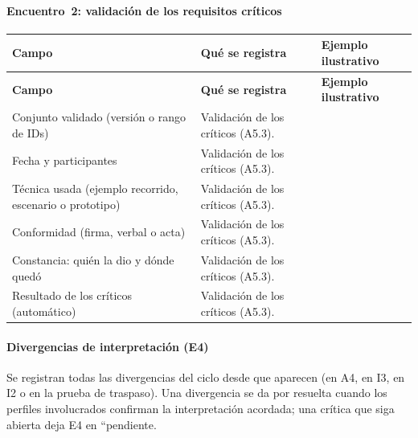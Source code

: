 \documentclass[12pt,letterpaper,oneside]{report}
\begin{document}
\paragraph{Encuentro~2: validación de los requisitos críticos}
{\scriptsize\renewcommand{\arraystretch}{1.25}\setlength{\tabcolsep}{3pt}
\begin{xltabular}{\textwidth}{@{}>{\raggedright\arraybackslash}p{0.25\textwidth}>{\raggedright\arraybackslash}X>{\raggedright\arraybackslash}p{0.30\textwidth}@{}}
\toprule
\textbf{Campo} & \textbf{Qué se registra} & \textbf{Ejemplo ilustrativo} \\
\midrule
\endfirsthead
\toprule
\textbf{Campo} & \textbf{Qué se registra} & \textbf{Ejemplo ilustrativo} \\
\midrule
\endhead
\bottomrule
\endlastfoot
Conjunto validado (versión o rango de IDs) & Validación de los críticos (A5.3). &  \\
Fecha y participantes & Validación de los críticos (A5.3). &  \\
Técnica usada (ejemplo recorrido, escenario o prototipo) & Validación de los críticos (A5.3). &  \\
Conformidad (firma, verbal o acta) & Validación de los críticos (A5.3). &  \\
Constancia: quién la dio y dónde quedó & Validación de los críticos (A5.3). &  \\
Resultado de los críticos (automático) & Validación de los críticos (A5.3). &  \\
\end{xltabular}}

\paragraph{Divergencias de interpretación (E4)}
Se registran todas las divergencias del ciclo desde que aparecen (en A4, en I3, en I2 o en la prueba de traspaso). Una divergencia se da por resuelta cuando los perfiles involucrados confirman la interpretación acordada; una crítica que siga abierta deja E4 en ``pendiente.
\end{document}
